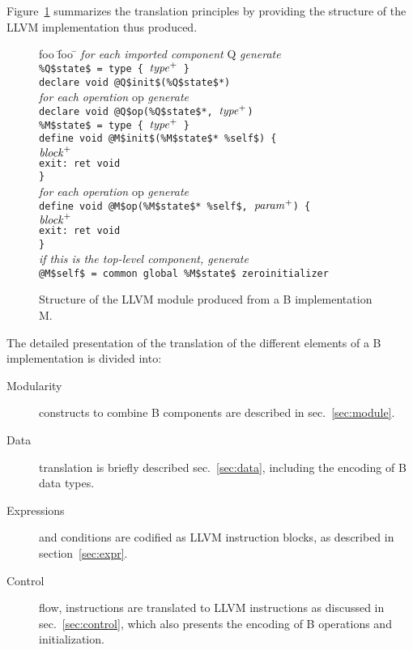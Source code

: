 \documentclass{llncs}
\newcommand{\llvm}[1]{\texttt{#1}}
\newcommand{\B}[1]{\textsf{#1}}
\newcommand{\ListOf}[1]{$\mbox{#1}^+$}
\newcommand{\nt}[1]{{\normalfont\textit{#1}}}
\begin{document}
Figure~\ref{fig:skel} summarizes the translation principles by providing the
structure of the LLVM implementation thus produced.

\begin{figure}
  \begin{center}
    \begin{tabbing}
      foo \= foo \= \kill
      \textit{for each imported component} \B{Q} \textit{generate} \\
      \> \llvm{\%Q\$state\$ = type \{ \ListOf{\nt{type}} \}} \\
      \> \llvm{declare void @Q\$init\$(\%Q\$state\$*)} \\
      \> \textit{for each operation} \B{op} \textit{generate} \\
      \> \> \llvm{declare void @Q\$op(\%Q\$state\$*, \ListOf{\nt{type}})} \\
      \llvm{\%M\$state\$ = type \{ \ListOf{\nt{type}} \}} \\
      \llvm{define void @M\$init\$(\%M\$state\$* \%self\$) \{} \\
      \> \llvm{\ListOf{\nt{block}}} \\
      \> \llvm{exit: ret void} \\
      \llvm{\}} \\
      \textit{for each operation} \B{op} \textit{generate} \\
      \> \llvm{define void @M\$op(\%M\$state\$* \%self\$, \ListOf{\nt{param}}) \{} \\
      \> \> \llvm{\ListOf{\nt{block}}} \\
      \> \> \llvm{exit: ret void} \\
      \> \llvm{\}} \\
      \textit{if this is the top-level component, generate} \\
      \> \llvm{@M\$self\$ = common global \%M\$state\$ zeroinitializer}
    \end{tabbing}
  \end{center}
  \caption{Structure of the LLVM module produced from a B implementation \B{M}.}
  \label{fig:skel}
\end{figure}

The detailed presentation of the translation of the different elements of a B
implementation is divided into:
\begin{description}
\item[Modularity] constructs to combine B components are described in
  sec.~\ref{sec:module}.
\item[Data] translation is briefly described sec.~\ref{sec:data}, including
  the encoding of B data types.
\item[Expressions] and conditions are codified as LLVM instruction blocks, as
  described in section~\ref{sec:expr}.
\item[Control] flow, instructions are translated to LLVM instructions as
  discussed in sec.~\ref{sec:control}, which also presents the encoding
  of B operations and initialization.
\end{description}
\end{document}
